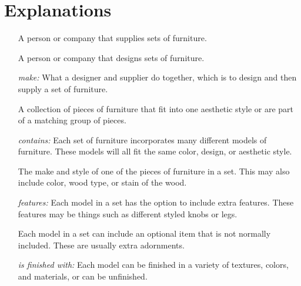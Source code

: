 \documentclass[american,extrafontsizes,12pt,portrait,letterpaper,oneside,onecolumn,article,final]{memoir}
\begin{document}
\section*{Explanations}
%
\begin{enumerate}[leftmargin=*,widest={\strong{Distribution Center:}}]

\item[\strong{\hypertarget{Supplier}{Supplier}:}]
%
A person or company that supplies sets of furniture.

\item[\strong{\hypertarget{Designer}{Designer}:}]
%
A person or company that designs sets of furniture.

\item[\emph{\hypertarget{Supplier-Designer-Set-rel}{make}:}]
%
What a designer and supplier do together, which is to design and then supply a set of furniture.

\item[\strong{\hypertarget{Set}{Set}:}]
%
A collection of pieces of furniture that fit into one aesthetic style or are part of a matching group of pieces.

\item[\emph{\hypertarget{Set-Model-rel}{contains}:}]
%
Each set of furniture incorporates many different models of furniture.
These models will all fit the same color, design, or aesthetic style.

\item[\strong{\hypertarget{Model}{Model}:}]
%
The make and style of one of the pieces of furniture in a set.
This may also include color, wood type, or stain of the wood.

\item[\emph{\hypertarget{Model-Feature-rel}{features}:}]
%
Each model in a set has the option to include extra features.
These features may be things such as different styled knobs or legs.

\item[\strong{\hypertarget{Feature}{Feature}:}]
%
Each model in a set can include an optional item that is not normally included.
These are usually extra adornments.

\item[\emph{\hypertarget{Model-Finish-rel}{is finished with}:}]
%
Each model can be finished in a variety of textures, colors, and materials, or can be unfinished.


\end{enumerate}
\end{document}
